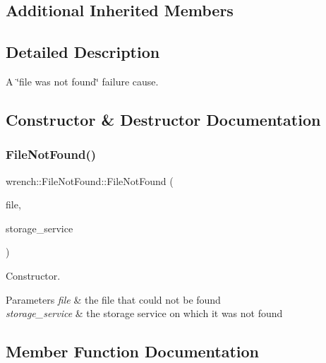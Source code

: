 \subsection*{Additional Inherited Members}


\subsection{Detailed Description}
A \char`\"{}file was not found\char`\"{} failure cause. 

\subsection{Constructor \& Destructor Documentation}
\mbox{\label{classwrench_1_1_file_not_found_a7a9df85cd197ba69784965503c7610af}} 
\subsubsection{\texorpdfstring{File\+Not\+Found()}{FileNotFound()}}
{\footnotesize\ttfamily wrench\+::\+File\+Not\+Found\+::\+File\+Not\+Found (\begin{DoxyParamCaption}\item[{\hyperlink{classwrench_1_1_workflow_file}{Workflow\+File} $\ast$}]{file,  }\item[{\hyperlink{classwrench_1_1_storage_service}{Storage\+Service} $\ast$}]{storage\+\_\+service }\end{DoxyParamCaption})}



Constructor. 


\begin{DoxyParams}{Parameters}
{\em file} & the file that could not be found \\
\hline
{\em storage\+\_\+service} & the storage service on which it was not found \\
\hline
\end{DoxyParams}


\subsection{Member Function Documentation}
\mbox{\label{classwrench_1_1_file_not_found_aa89df5eaeb42af70876ac6ce084de33d}} 
